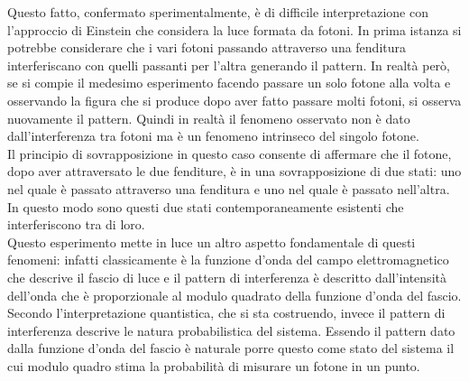 Questo fatto, confermato sperimentalmente, è di difficile interpretazione con l'approccio di Einstein che considera la luce formata da fotoni. In prima istanza si potrebbe considerare che i vari fotoni passando attraverso una fenditura interferiscano con quelli passanti per l'altra generando il pattern. In realtà però, se si compie il medesimo esperimento facendo passare un solo fotone alla volta e osservando la figura che si produce dopo aver fatto passare molti fotoni, si osserva nuovamente il pattern. Quindi in realtà il fenomeno osservato non è dato dall'interferenza tra fotoni ma è un fenomeno intrinseco del singolo fotone.\\ Il principio di sovrapposizione in questo caso consente di affermare che il fotone, dopo aver attraversato le due fenditure, è in una sovrapposizione di due stati: uno nel quale è passato attraverso una fenditura e uno nel quale è passato nell'altra. In questo modo sono questi due stati contemporaneamente esistenti che interferiscono tra di loro.\\

Questo esperimento mette in luce un altro aspetto fondamentale di questi fenomeni: infatti classicamente è la funzione d'onda del campo elettromagnetico che descrive il fascio di luce e il pattern di interferenza è descritto dall'intensità dell'onda che è proporzionale al modulo quadrato della funzione d'onda del fascio. Secondo l'interpretazione quantistica, che si sta costruendo, invece il pattern di interferenza descrive le natura probabilistica del sistema. Essendo il pattern dato dalla funzione d'onda del fascio è naturale porre questo come stato del sistema il cui modulo quadro stima la probabilità di misurare un fotone in un punto. 

